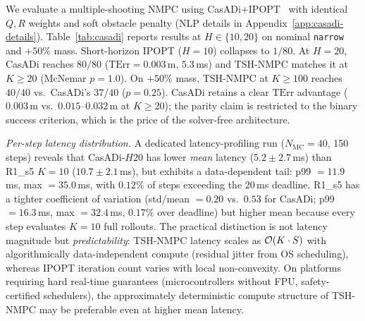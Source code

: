 \documentclass[11pt,onecolumn,a4paper]{article}
\newcommand{\Nm}{N_{\mathrm{MC}}}
\newcommand{\TErr}{\mathrm{TErr}}
\begin{document}
We evaluate a multiple-shooting NMPC using CasADi+IPOPT~\cite{AND19,WAC06}
with identical $Q,R$ weights and soft obstacle penalty (NLP details in
Appendix~\ref{app:casadi-details}). Table~\ref{tab:casadi} reports
results at $H \in \{10, 20\}$ on nominal \texttt{narrow} and $+50\%$
mass. Short-horizon IPOPT ($H = 10$) collapses to $1/80$. At $H = 20$,
CasADi reaches $80/80$ ($\TErr = 0.003\,$m, $5.3\,$ms) and TSH-NMPC
matches it at $K \ge 20$ (McNemar $p = 1.0$). On $+50\%$ mass,
TSH-NMPC at $K \ge 100$ reaches $40/40$ vs.\ CasADi's $37/40$
($p = 0.25$). CasADi retains a clear $\TErr$ advantage ($0.003\,$m vs.\
$0.015$--$0.032\,$m at $K \ge 20$); the parity claim is restricted to the binary
success criterion, which is the price of the solver-free architecture.

\emph{Per-step latency distribution.}
A dedicated latency-profiling run ($\Nm = 40$, 150 steps) reveals that
CasADi-$H20$ has lower \emph{mean} latency ($5.2 \pm 2.7\,$ms) than
R1\_s5 $K{=}10$ ($10.7 \pm 2.1\,$ms), but exhibits a data-dependent
tail: p99 $= 11.9\,$ms, max $= 35.0\,$ms, with $0.12\%$ of steps
exceeding the $20\,$ms deadline.
R1\_s5 has a tighter coefficient of variation (std/mean $= 0.20$ vs.\
$0.53$ for CasADi; p99 $= 16.3\,$ms, max $= 32.4\,$ms,
$0.17\%$ over deadline) but higher mean because
every step evaluates $K = 10$ full rollouts.
The practical distinction is not latency magnitude but \emph{predictability}:
TSH-NMPC latency scales as ${\cal O}(K \cdot S)$ with algorithmically
data-independent compute (residual jitter from OS scheduling),
whereas IPOPT iteration count varies with local non-convexity.
On platforms requiring hard real-time guarantees
(microcontrollers without FPU, safety-certified schedulers),
the approximately deterministic compute structure of TSH-NMPC may be
preferable even at higher mean latency.
\end{document}
